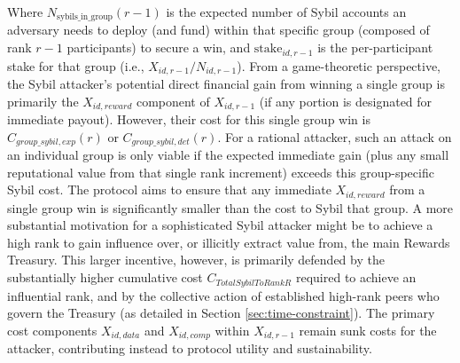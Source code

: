 \documentclass{article}
\begin{document}
\begin{CJK}{UTF8}{gbsn}
        Where $N_{\text{sybils\_in\_group}}(r-1)$ is the expected number of Sybil accounts an adversary needs to deploy (and fund) within that specific group (composed of rank $r-1$ participants) to secure a win, and $\text{stake}_{id,r-1}$ is the per-participant stake for that group (i.e., $X_{id,r-1}/N_{id,r-1}$).
        From a game-theoretic perspective, the Sybil attacker's potential direct financial gain from winning a single group is primarily the $X_{id,reward}$ component of $X_{id,r-1}$ (if any portion is designated for immediate payout). However, their cost for this single group win is $C_{group\_sybil,exp}(r)$ or $C_{group\_sybil,det}(r)$. For a rational attacker, such an attack on an individual group is only viable if the expected immediate gain (plus any small reputational value from that single rank increment) exceeds this group-specific Sybil cost. The protocol aims to ensure that any immediate $X_{id,reward}$ from a single group win is significantly smaller than the cost to Sybil that group. A more substantial motivation for a sophisticated Sybil attacker might be to achieve a high rank to gain influence over, or illicitly extract value from, the main Rewards Treasury. This larger incentive, however, is primarily defended by the substantially higher cumulative cost $C_{TotalSybilToRankR}$ required to achieve an influential rank, and by the collective action of established high-rank peers who govern the Treasury (as detailed in Section \ref{sec:time-constraint}). The primary cost components $X_{id,data}$ and $X_{id,comp}$ within $X_{id,r-1}$ remain sunk costs for the attacker, contributing instead to protocol utility and sustainability.


\end{CJK}
\end{document}
